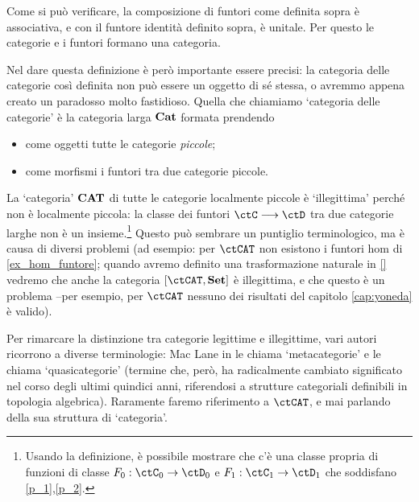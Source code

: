 \begin{definition}\label{ex_cat_cat}
	Come si può verificare, la composizione di funtori come definita sopra è associativa, e con il funtore identità definito sopra, è unitale. Per questo le categorie e i funtori formano una categoria.

	Nel dare questa definizione è però importante essere precisi: la categoria delle categorie così definita non può essere un oggetto di sé stessa, o avremmo appena creato un paradosso molto fastidioso. Quella che chiamiamo `categoria delle categorie' è la categoria larga \(\mathbf{Cat}\)  formata prendendo
	\begin{itemize}
		\item come oggetti tutte le categorie \emph{piccole};
		\item come morfismi i funtori tra due categorie piccole.
	\end{itemize}
\end{definition}
La `categoria' \(\mathbf{CAT}\) di tutte le categorie localmente piccole è `illegittima' perché non è localmente piccola: la classe dei funtori \(\ctC \fun\ctD\) tra due categorie larghe non è un insieme.\footnote{Usando la definizione, è possibile mostrare che c'è una classe propria di funzioni di classe \(F_0 : \ctC_0 \to \ctD_0\) e \(F_1 : \ctC_1 \to \ctD_1\) che soddisfano \ref{p_1},\ref{p_2}.} Questo può sembrare un puntiglio terminologico, ma è causa di diversi problemi (ad esempio: per \(\ctCAT\) non esistono i funtori hom di \ref{ex_hom_funtore}; quando avremo definito una trasformazione naturale in \ref{} vedremo che anche la categoria \([\ctCAT,\ctSet]\) è illegittima, e che questo è un problema --per esempio, per \(\ctCAT\) nessuno dei risultati del capitolo \ref{cap:yoneda} è valido).

Per rimarcare la distinzione tra categorie legittime e illegittime, vari autori ricorrono a diverse terminologie: Mac Lane in \cite{working-categories} le chiama `metacategorie' e \cite{acc} le chiama `quasicategorie' (termine che, però, ha radicalmente cambiato significato nel corso degli ultimi quindici anni, riferendosi a strutture categoriali definibili in topologia algebrica). Raramente faremo riferimento a \(\ctCAT\), e mai parlando della sua struttura di `categoria'.
\begin{definition}\label{def_diagramma_comm}
\end{definition}


